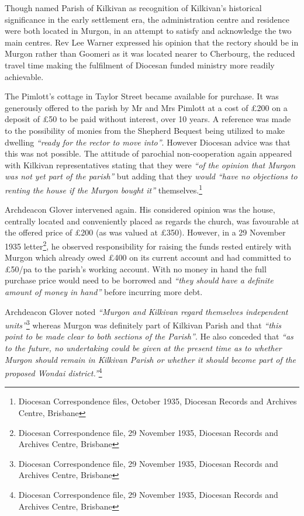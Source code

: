 Though named Parish of Kilkivan as recognition of Kilkivan's historical significance in the early settlement era, the administration centre and residence were both located in Murgon, in an attempt to satisfy and acknowledge the two main centres. Rev Lee Warner expressed his opinion that the rectory should be in Murgon rather than Goomeri as it was located nearer to Cherbourg, the reduced travel time making the fulfilment of Diocesan funded ministry more readily achievable.



The Pimlott's cottage in Taylor Street became available for purchase. It was generously offered to the parish by Mr and Mrs Pimlott at a cost of \pounds200 on a deposit of \pounds50 to be paid without interest, over 10 years. A reference was made to the possibility of monies from the Shepherd Bequest being utilized to make dwelling \emph{``ready for the rector to move into''}. However Diocesan advice was that this was not possible. The attitude of parochial non-cooperation again appeared with Kilkivan representatives stating that they were \emph{``of the opinion that Murgon was not yet part of the parish''} but adding that they \emph{would ``have no objections to renting the house if the Murgon bought it''} themselves.\footnote{Diocesan Correspondence files, October 1935, Diocesan Records and Archives Centre, Brisbane}


Archdeacon Glover intervened again. His considered opinion was the house, centrally located and conveniently placed as regards the church, was favourable at the offered price of \pounds200 (as was valued at \pounds350). However, in a 29 November 1935 letter\footnote{Diocesan Correspondence file, 29 November 1935, Diocesan Records and Archives Centre, Brisbane}, he observed responsibility for raising the funds rested entirely with Murgon which already owed \pounds400 on its current account and had committed to \pounds50/pa to the parish's working account. With no money in hand the full purchase price would need to be borrowed and \emph{``they should have a definite amount of money in hand''} before incurring more debt.


Archdeacon Glover noted \emph{``Murgon and Kilkivan regard themselves independent units''}\footnote{Diocesan Correspondence file, 29 November 1935, Diocesan Records and Archives Centre, Brisbane} whereas Murgon was definitely part of Kilkivan Parish and that \emph{``this point to be made clear to both sections of the Parish''}. He also conceded that \emph{``as to the future, no undertaking could be given at the present time as to whether Murgon should remain in Kilkivan Parish or whether it should become part of the proposed Wondai district.''}\footnote{Diocesan Correspondence file, 29 November 1935, Diocesan Records and Archives Centre, Brisbane}








